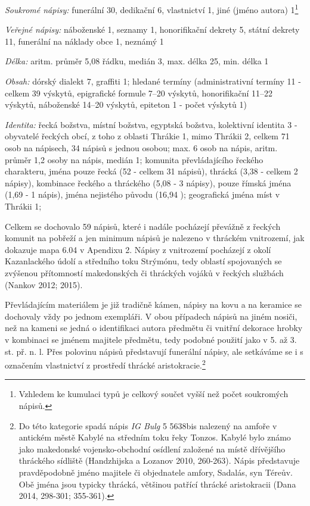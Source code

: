 {\em Soukromé nápisy:} funerální 30, dedikační 6, vlastnictví 1, jiné (jméno autora) 1\footnote{Vzhledem ke kumulaci typů je celkový součet vyšší než počet soukromých nápisů.}

{\em Veřejné nápisy:} náboženské 1, seznamy 1, honorifikační dekrety 5, státní dekrety 11, funerální na náklady obce 1, neznámý 1

{\em Délka:} aritm. průměr 5,08 řádku, medián 3, max. délka 25, min. délka 1

{\em Obsah:} dórský dialekt 7, graffiti 1; hledané termíny (administrativní termíny 11 - celkem 39 výskytů, epigrafické formule 7--20 výskytů, honorifikační 11--22 výskytů, náboženské 14--20 výskytů, epiteton 1 - počet výskytů 1)

{\em Identita:} řecká božstva, místní božstva, egyptská božstva, kolektivní identita 3 - obyvatelé řeckých obcí, z toho z oblasti Thrákie 1, mimo Thrákii 2, celkem 71 osob na nápisech, 34 nápisů s jednou osobou; max. 6 osob na nápis, aritm. průměr 1,2 osoby na nápis, medián 1; komunita převládajícího řeckého charakteru, jména pouze řecká (52  - celkem 31 nápisů), thrácká (3,38  - celkem 2 nápisy), kombinace řeckého a thráckého (5,08  - 3 nápisy), pouze římská jména (1,69  - 1 nápis), jména nejistého původu (16,94 ); geografická jména míst v Thrákii 1;

\NC\AR
\HL
\HL
\stoptable

Celkem se dochovalo 59 nápisů, které i nadále pocházejí převážně z řeckých komunit na pobřeží a jen minimum nápisů je nalezeno v thráckém vnitrozemí, jak dokazuje mapa 6.04 v Apendixu 2. Nápisy z vnitrozemí pocházejí z okolí Kazanlackého údolí a středního toku Strýmónu, tedy oblastí spojovaných se zvýšenou přítomností makedonských či thráckých vojáků v řeckých službách (Nankov 2012; 2015).

Převládajícím materiálem je již tradičně kámen, nápisy na kovu a na keramice se dochovaly vždy po jednom exempláři. V obou případech nápisů na jiném nosiči, než na kameni se jedná o identifikaci autora předmětu či vnitřní dekorace hrobky v kombinaci se jménem majitele předmětu, tedy podobné použití jako v 5. až 3. st. př. n. l. Přes polovinu nápisů představují funerální nápisy, ale setkáváme se i s označením vlastnictví z prostředí thrácké aristokracie.\footnote{Do této kategorie spadá nápis {\em IG Bulg} 5 5638bis nalezený na amfoře v antickém městě Kabylé na středním toku řeky Tonzos. Kabylé bylo známo jako makedonské vojensko-obchodní osídlení založené na místě dřívějšího thráckého sídliště (Handzhijska a Lozanov 2010, 260-263). Nápis představuje pravděpodobně jméno majitele či objednatele amfory, Sadalás, syn Téreův. Obě jména jsou typicky thrácká, většinou patřící thrácké aristokracii (Dana 2014, 298-301; 355-361).}


